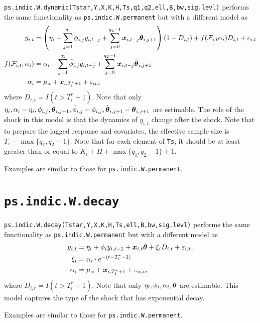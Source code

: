 \documentclass[12pt]{article}
\begin{document}
 \texttt{ps.indic.W.dynamic(Tstar,Y,X,K,H,Ts,q1,q2,ell,B,bw,sig.levl)} performs the same functionality as  \texttt{ps.indic.W.permanent} but with a different model as 
 \begin{align*}
 	y_{i,t}
 	&= \left(\eta_i + \sum_{j=1}^{q_1} \phi_{i,j} y_{i, t-j} + \sum_{j=0}^{q_2-1} \boldsymbol{x}_{i, t-j}\boldsymbol{\theta}_{i, j + 1} \right) (1-D_{i,t}) + f(\mathcal{F}_{i, t} \alpha_i)D_{i,t} + \varepsilon_{i,t}  \\
 	f(\mathcal{F}_{i,t},\alpha_i)	 & = \alpha_i +\sum_{j=1}^{q_1} \tilde{\phi}_{i, j} y_{i, t-j} + \sum_{j=0}^{q_2-1} \boldsymbol{x}_{i, t-j} \tilde{\boldsymbol{\theta}}_{i, j +1} \\
 	\alpha_i & = \mu_{\alpha} + \boldsymbol{x}_{i, T_i^*+1} + \varepsilon_{\alpha, i}
 \end{align*}
 where $D_{i,t}=I(t > T_i^*+1)$. Note that only $\eta_i, \alpha_i - \eta_i, \phi_{i,j}, \boldsymbol{\theta}_{i, j+1}, \tilde{\phi}_{i,j}-\phi_{i,j}, \tilde{\boldsymbol{\theta}}_{i,j+1}-\boldsymbol{\theta}_{i, j+1}$ are estimable.
The role of the shock in this model is that the dynamics of $y_{i,t}$ change after the shock. Note that to prepare the lagged response and covariates, the effective sample size is $T_i-\max\{q_1, q_2-1\}$.  Note that for each element of \texttt{Ts}, it should be at least greater than or equal to $K_i + H + \max\{q_1, q_2-1\}+1$.

Examples are similar to those for \texttt{ps.indic.W.permanent}.

\section{\texttt{ps.indic.W.decay}}
 
 \texttt{ps.indic.W.decay(Tstar,Y,X,K,H,Ts,ell,B,bw,sig.levl)} performs the same functionality as  \texttt{ps.indic.W.permanent} but with a different model as 
 \begin{align*}
 	y_{i,t} &= \eta_i + \phi_i y_{i, t-1}  + \boldsymbol{x}_{i, t}\boldsymbol{\theta} + \xi_i D_{i,t} + \varepsilon_{i,t},\\
 	\xi_i &= \alpha_i \cdot e^{-(t-T_i^*-1)} \\
 	\alpha_i & = \mu_{\alpha} + \boldsymbol{x}_{i, T_i^*+1} + \varepsilon_{\alpha, i},
 \end{align*}
 where $D_{i,t}=I(t > T_i^*+1)$. Note that only $\eta_i, \phi_i, \alpha_i, \boldsymbol{\theta}$ are estimable. This model captures the type of the shock that has exponential decay.
 
 Examples are similar to those for \texttt{ps.indic.W.permanent}.
 
\end{document}
